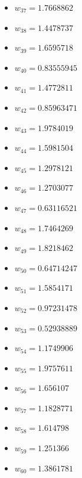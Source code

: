 \documentclass[11pt]{article}
\begin{document}
\begin{itemize}
\item $w_{37} = 1.7668862$
\item $w_{38} = 1.4478737$
\item $w_{39} = 1.6595718$
\item $w_{40} = 0.83555945$
\item $w_{41} = 1.4772811$
\item $w_{42} = 0.85963471$
\item $w_{43} = 1.9784019$
\item $w_{44} = 1.5981504$
\item $w_{45} = 1.2978121$
\item $w_{46} = 1.2703077$
\item $w_{47} = 0.63116521$
\item $w_{48} = 1.7464269$
\item $w_{49} = 1.8218462$
\item $w_{50} = 0.64714247$
\item $w_{51} = 1.5854171$
\item $w_{52} = 0.97231478$
\item $w_{53} = 0.52938889$
\item $w_{54} = 1.1749906$
\item $w_{55} = 1.9757611$
\item $w_{56} = 1.656107$
\item $w_{57} = 1.1828771$
\item $w_{58} = 1.614798$
\item $w_{59} = 1.251366$
\item $w_{60} = 1.3861781$
\end{itemize}
\end{document}
